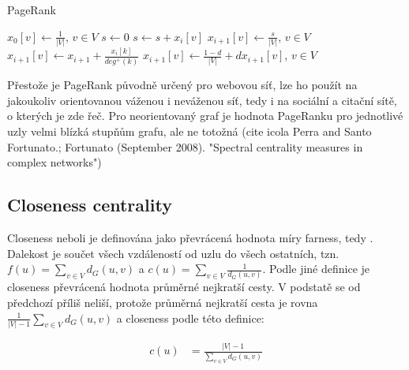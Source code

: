 \documentclass{bakalarka}
\begin{document}
\begin{center}
\begin{minipage}{\textwidth}
\begin{algorithm}[H]
	\caption{PageRank}
		\label{alg:pagerank}

	\begin{algorithmic}[1]
	\Statex
	\State $x_0[v] \gets \frac{1}{|V|}$, $v \in V$
		\State $s \gets 0$
				\State $s \gets s + x_{i}[v]$
			\EndIf
		\EndFor
		\State $x_{i + 1}[v] \gets \frac{s}{|V|}$, $v \in V$
				\State $x_{i + 1}[v] \gets x_{i + 1} + \frac{x_i[k]}{deg^+(k)}$
			\EndFor
		\EndFor
		\State $x_{i + 1}[v] \gets \frac{1 - d}{|V|} + d x_{i + 1}[v]$, $v \in V$
	\EndFor
	\end{algorithmic}
\end{algorithm}
\end{minipage}
\end{center}
\mbox{}

Přestože je PageRank původně určený pro webovou síť, lze ho použít na
jakoukoliv orientovanou váženou i neváženou síť, tedy i na sociální a citační
sítě, o kterých je zde řeč. Pro neorientovaný graf je hodnota PageRanku pro
jednotlivé uzly velmi blízká stupňům grafu, ale ne totožná (cite icola Perra
and Santo Fortunato.; Fortunato (September 2008). "Spectral centrality measures
in complex networks")


\subsection{Closeness centrality}
Closeness neboli  je definována jako převrácená hodnota míry
farness, tedy . Dalekost je součet všech vzdáleností od uzlu do
všech ostatních, tzn. $f(u) = \sum_{v \in V} d_G(u, v)$ a $c(u) = \sum_{v \in
V} \frac{1}{d_G(u, v)}$. Podle jiné definice je closeness převrácená hodnota
průměrné nejkratší cesty. V podstatě se od předchozí příliš neliší, protože
průměrná nejkratší cesta je rovna $\frac{1}{|V|
- 1} \sum_{v \in V} d_G(u, v)$ a closeness podle této definice:

\begin{align*}
c(u) &= \frac{|V| - 1}{\sum_{v \in V} d_G(u, v)}
\end{align*}
\end{document}
